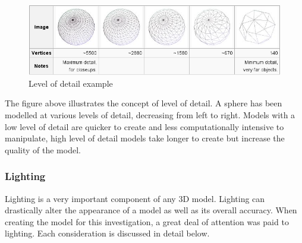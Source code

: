 \documentclass[11pt,a4paper]{report}
\begin{document}
			\begin{figure}[H]
				\centering
				\includegraphics[width=1\textwidth]{level_of_detail_example}
				\caption{Level of detail example}
			\end{figure}
			
			The figure above illustrates the concept of level of detail. A sphere has been modelled at various levels of detail, decreasing from left to right. Models with a low level of detail are quicker to create and less computationally intensive to manipulate, high level of detail models take longer to create but increase the quality of the model.
				
			\subsubsection{Lighting}
				Lighting is a very important component of any 3D model. Lighting can drastically alter the appearance of a model as well as its overall accuracy. When creating the model for this investigation, a great deal of attention was paid to lighting. Each consideration is discussed in detail below.
				
\end{document}
